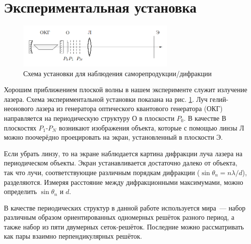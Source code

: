\section{Экспериментальная установка}
\begin{figure}[h]
    \centering
    \includegraphics[width=0.7\textwidth]{img/setup.png}
    \caption{Схема установки для наблюдения саморепродукции/дифракции}
    \label{fig:setup}
\end{figure}

Хорошим приближением плоской волны в нашем эксперименте служит излучение лазера. Схема экспериментальной установки показана на рис. \ref{fig:setup}. Луч гелий-неонового лазера из генератора оптического квантового генератора (ОКГ) направляется на периодическую структуру О в плоскости $P_0$. В качестве  В плоскостях $P_1$-$P_N$ возникают изображения объекта, которые с помощью линзы Л можно поочерёдно проецировать на экран, установленный в плоскости Э.

Если убрать линзу, то на экране наблюдается картина дифракции луча лазера на периодическом объекты. Экран устанавливается достаточно далеко от объекта, так что лучи, соответствующие различным порядкам дифракции ($\sin \theta_n = n\lambda/d$), разделяются. Измеряя расстояние между дифракционными максимумами, можно определить $\sin \theta_n$ и $d$.

В качестве периодических структур в данной работе используется мира~--- набор различным образом ориентированных одномерных решёток разного период, а также набор из пяти двумерных сеток-решёток. Последние можно рассматривать как пары взаимно перпендикулярных решёток.